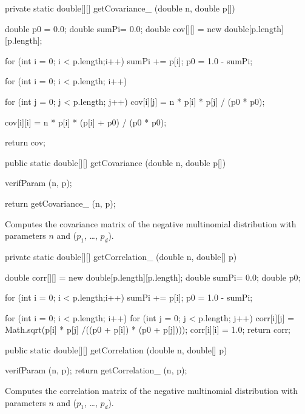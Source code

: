 \begin{code}\begin{hide}

   private static double[][] getCovariance_ (double n, double p[]) {
      double p0 = 0.0;
      double sumPi= 0.0;
      double cov[][] = new double[p.length][p.length];

      for (int i = 0; i < p.length;i++)
         sumPi += p[i];
      p0 = 1.0 - sumPi;

      for (int i = 0; i < p.length; i++)
      {
         for (int j = 0; j < p.length; j++)
            cov[i][j] = n * p[i] * p[j] / (p0 * p0);

         cov[i][i] = n * p[i] * (p[i] + p0) / (p0 * p0);
      }

      return cov;
   }\end{hide}

   public static double[][] getCovariance (double n, double p[])\begin{hide} {
      verifParam (n, p);

      return getCovariance_ (n, p);
   }\end{hide}
\end{code}
\begin{tabb}
   Computes the covariance matrix of the negative multinomial distribution
   with parameters $n$ and ($p_1$, \ldots, $p_d$).
\end{tabb}
\begin{code}\begin{hide}

   private static double[][] getCorrelation_ (double n, double[] p) {
      double corr[][] = new double[p.length][p.length];
      double sumPi= 0.0;
      double p0;

      for (int i = 0; i < p.length;i++)
         sumPi += p[i];
      p0 = 1.0 - sumPi;

      for (int i = 0; i < p.length; i++) {
         for (int j = 0; j < p.length; j++)
            corr[i][j] = Math.sqrt(p[i] * p[j] /((p0 + p[i]) * (p0 + p[j])));
         corr[i][i] = 1.0;
      }
      return corr;
   }\end{hide}

   public static double[][] getCorrelation (double n, double[] p)\begin{hide} {
      verifParam (n, p);
      return getCorrelation_ (n, p);
   }\end{hide}
\end{code}
\begin{tabb}
   Computes the correlation matrix of the negative multinomial distribution
   with parameters $n$ and ($p_1$, \ldots, $p_d$).
\end{tabb}
